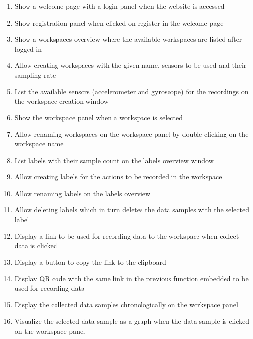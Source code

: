\begin{enumerate}[{label = \textbf{/F{\protect\twodigits{\arabic{enumi}}}0/}, leftmargin = *}]
    \item \label{itm:welcome-page}Show a welcome page with a login panel when the website is accessed
    \item \label{itm:registration-panel}Show registration panel when clicked on register in the welcome page
    \item \label{itm:workspaces-overview}Show a \glspl{workspace} overview where the available \glspl{workspace} are listed after logged in
    \item \label{itm:create-workspace}Allow creating \glspl{workspace} with the given name, \glspl{sensor} to be used and their sampling rate
    \item \label{itm:cr-list-sensors}List the available \glspl{sensor} (\gls{accelerometer} and \gls{gyroscope}) for the recordings on the \gls{workspace} creation window
    \item \label{itm:workspace-panel}Show the \gls{workspace} panel when a \gls{workspace} is selected
    \item \label{itm:rename-workspace}Allow renaming \glspl{workspace} on the \gls{workspace} panel by double clicking on the \gls{workspace} name
    \item \label{itm:labels-overview}List labels with their sample count on the labels overview window
    \item \label{itm:create-label}Allow creating labels for the actions to be recorded in the \gls{workspace}
    \item \label{itm:rename-label}Allow renaming labels on the labels overview
    \item \label{itm:delete-label}Allow deleting labels which in turn deletes the \glspl{data sample} with the selected \gls{label}
    \item \label{itm:workspace-link}Display a link to be used for recording data to the \gls{workspace} when collect data is clicked
    \item \label{itm:workspace-copy-link}Display a button to copy the link to the clipboard
    \item \label{itm:workspace-qr}Display \gls{QR code} with the same link in the previous function embedded to be used for recording data
    \item \label{itm:display-samples}Display the collected \glspl{data sample} chronologically on the \gls{workspace} panel
    \item \label{itm:visualize-sample}Visualize the selected \gls{data sample} as a graph when the \gls{data sample} is clicked on the \gls{workspace} panel 

\end{enumerate}
